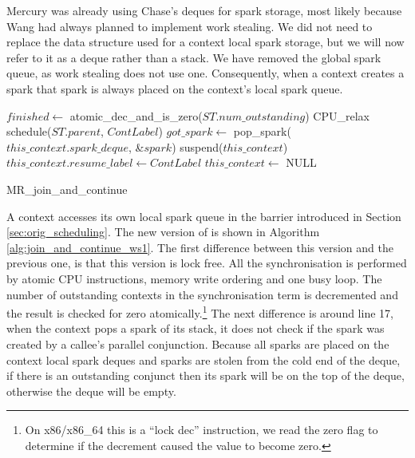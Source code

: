 Mercury was already using Chase's deques for spark storage,
most likely because Wang had always planned to implement work stealing.
We did not need to replace the data structure used for a context local
spark storage,
but we will now refer to it as a deque rather than a stack.
We have removed the global spark queue,
as work stealing does not use one.
Consequently,
when a context creates a spark that spark is always placed on the
context's local spark queue.

\begin{algorithm}
\begin{algorithmic}[1]
  \State $finished \gets$ atomic\_dec\_and\_is\_zero($ST.num\_outstanding$)
    \Else
        \State CPU\_relax
      \EndWhile
      \State schedule($ST.parent$, $ContLabel$)
    \EndIf
  \Else
    \State $got\_spark \gets$ pop\_spark($this\_context.spark\_deque$,
        \&$spark$)
    \Else
         \State suspend($this\_context$)
         \State $this\_context.resume\_label \gets ContLabel$
         \State $this\_context \gets$ NULL
      \EndIf
    \EndIf
  \EndIf
\EndProcedure
\end{algorithmic}
\caption{MR\_join\_and\_continue}
\label{alg:join_and_continue_ws1}
\end{algorithm}

A context accesses its own local spark queue in the \joinandcontinue barrier
introduced in Section \ref{sec:orig_scheduling}.
The new version of \joinandcontinue is shown in Algorithm
\ref{alg:join_and_continue_ws1}.
The first difference between this version and the previous one,
is that this version is lock free.
All the synchronisation is performed by atomic CPU instructions, memory
write ordering and one busy loop.
The number of outstanding contexts in the synchronisation term is
decremented and the result is checked for zero atomically.\footnote{
    On x86/x86\_64 this is a ``lock dec'' instruction, we read the zero flag
    to determine if the decrement caused the value to become zero.}
The next difference is around line 17,
when the context pops a spark of its stack, it does not check if the spark
was created by a callee's parallel conjunction.
Because all sparks are placed on the context local spark deques and
sparks are stolen from the cold end of the deque,
if there is an outstanding conjunct then its spark will be on the top of the
deque,
otherwise the deque will be empty.


